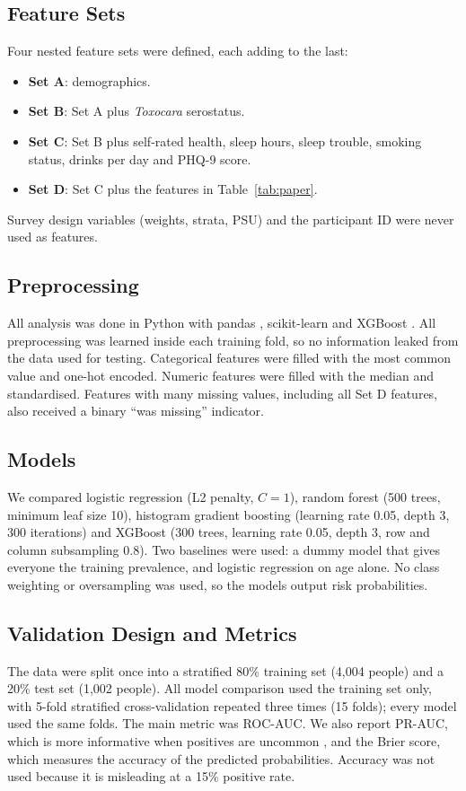 \documentclass[conference]{IEEEtran}
\begin{document}
\subsection{Feature Sets}
Four nested feature sets were defined, each adding to the last:
\begin{itemize}
\item \textbf{Set A}: demographics.
\item \textbf{Set B}: Set A plus \textit{Toxocara} serostatus.
\item \textbf{Set C}: Set B plus self-rated health, sleep hours, sleep trouble, smoking status, drinks per day and PHQ-9 score.
\item \textbf{Set D}: Set C plus the features in Table~\ref{tab:paper}.
\end{itemize}
Survey design variables (weights, strata, PSU) and the participant ID were never used as features.

\subsection{Preprocessing}
All analysis was done in Python with pandas \cite{mckinney2010}, scikit-learn \cite{pedregosa2011} and XGBoost \cite{chen2016}. All preprocessing was learned inside each training fold, so no information leaked from the data used for testing. Categorical features were filled with the most common value and one-hot encoded. Numeric features were filled with the median and standardised. Features with many missing values, including all Set D features, also received a binary ``was missing'' indicator.

\subsection{Models}
We compared logistic regression (L2 penalty, $C=1$), random forest \cite{breiman2001} (500 trees, minimum leaf size 10), histogram gradient boosting \cite{friedman2001} (learning rate 0.05, depth 3, 300 iterations) and XGBoost \cite{chen2016} (300 trees, learning rate 0.05, depth 3, row and column subsampling 0.8). Two baselines were used: a dummy model that gives everyone the training prevalence, and logistic regression on age alone. No class weighting or oversampling was used, so the models output risk probabilities.

\subsection{Validation Design and Metrics}
The data were split once into a stratified 80\% training set (4,004 people) and a 20\% test set (1,002 people). All model comparison used the training set only, with 5-fold stratified cross-validation repeated three times (15 folds); every model used the same folds. The main metric was ROC-AUC. We also report PR-AUC, which is more informative when positives are uncommon \cite{saito2015}, and the Brier score, which measures the accuracy of the predicted probabilities. Accuracy was not used because it is misleading at a 15\% positive rate.
\end{document}
